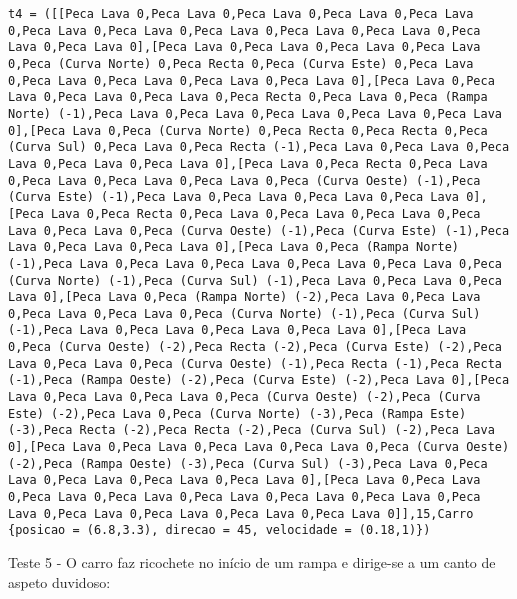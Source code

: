 \documentclass[a4paper]{report}
\begin{document}
\begin{lstlisting}
t4 = ([[Peca Lava 0,Peca Lava 0,Peca Lava 0,Peca Lava 0,Peca Lava 0,Peca Lava 0,Peca Lava 0,Peca Lava 0,Peca Lava 0,Peca Lava 0,Peca Lava 0,Peca Lava 0],[Peca Lava 0,Peca Lava 0,Peca Lava 0,Peca Lava 0,Peca (Curva Norte) 0,Peca Recta 0,Peca (Curva Este) 0,Peca Lava 0,Peca Lava 0,Peca Lava 0,Peca Lava 0,Peca Lava 0],[Peca Lava 0,Peca Lava 0,Peca Lava 0,Peca Lava 0,Peca Recta 0,Peca Lava 0,Peca (Rampa Norte) (-1),Peca Lava 0,Peca Lava 0,Peca Lava 0,Peca Lava 0,Peca Lava 0],[Peca Lava 0,Peca (Curva Norte) 0,Peca Recta 0,Peca Recta 0,Peca (Curva Sul) 0,Peca Lava 0,Peca Recta (-1),Peca Lava 0,Peca Lava 0,Peca Lava 0,Peca Lava 0,Peca Lava 0],[Peca Lava 0,Peca Recta 0,Peca Lava 0,Peca Lava 0,Peca Lava 0,Peca Lava 0,Peca (Curva Oeste) (-1),Peca (Curva Este) (-1),Peca Lava 0,Peca Lava 0,Peca Lava 0,Peca Lava 0],[Peca Lava 0,Peca Recta 0,Peca Lava 0,Peca Lava 0,Peca Lava 0,Peca Lava 0,Peca Lava 0,Peca (Curva Oeste) (-1),Peca (Curva Este) (-1),Peca Lava 0,Peca Lava 0,Peca Lava 0],[Peca Lava 0,Peca (Rampa Norte) (-1),Peca Lava 0,Peca Lava 0,Peca Lava 0,Peca Lava 0,Peca Lava 0,Peca (Curva Norte) (-1),Peca (Curva Sul) (-1),Peca Lava 0,Peca Lava 0,Peca Lava 0],[Peca Lava 0,Peca (Rampa Norte) (-2),Peca Lava 0,Peca Lava 0,Peca Lava 0,Peca Lava 0,Peca (Curva Norte) (-1),Peca (Curva Sul) (-1),Peca Lava 0,Peca Lava 0,Peca Lava 0,Peca Lava 0],[Peca Lava 0,Peca (Curva Oeste) (-2),Peca Recta (-2),Peca (Curva Este) (-2),Peca Lava 0,Peca Lava 0,Peca (Curva Oeste) (-1),Peca Recta (-1),Peca Recta (-1),Peca (Rampa Oeste) (-2),Peca (Curva Este) (-2),Peca Lava 0],[Peca Lava 0,Peca Lava 0,Peca Lava 0,Peca (Curva Oeste) (-2),Peca (Curva Este) (-2),Peca Lava 0,Peca (Curva Norte) (-3),Peca (Rampa Este) (-3),Peca Recta (-2),Peca Recta (-2),Peca (Curva Sul) (-2),Peca Lava 0],[Peca Lava 0,Peca Lava 0,Peca Lava 0,Peca Lava 0,Peca (Curva Oeste) (-2),Peca (Rampa Oeste) (-3),Peca (Curva Sul) (-3),Peca Lava 0,Peca Lava 0,Peca Lava 0,Peca Lava 0,Peca Lava 0],[Peca Lava 0,Peca Lava 0,Peca Lava 0,Peca Lava 0,Peca Lava 0,Peca Lava 0,Peca Lava 0,Peca Lava 0,Peca Lava 0,Peca Lava 0,Peca Lava 0,Peca Lava 0]],15,Carro {posicao = (6.8,3.3), direcao = 45, velocidade = (0.18,1)})
\end{lstlisting}

Teste 5 - O carro faz ricochete no início de um rampa e dirige-se a um canto de aspeto duvidoso:
\end{document}
